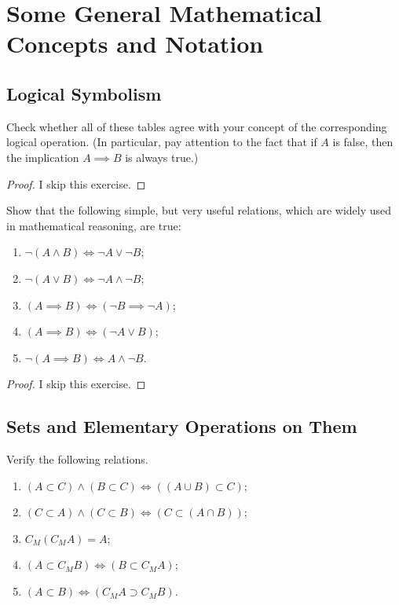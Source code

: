 \chapter{Some General Mathematical Concepts and Notation}

\section{Logical Symbolism}

\begin{exercise}
    Check whether all of these tables agree with your concept of the corresponding logical operation. (In particular, pay attention to the fact that if $A$ is false, then the implication $A\implies B$ is always true.)
\end{exercise}

\begin{proof}
    I skip this exercise.
\end{proof}

\begin{exercise}
    Show that the following simple, but very useful relations, which are widely used in mathematical reasoning, are true:
    \begin{enumerate}[label={(\alph*)}]
        \item $\neg(A\land B) \Leftrightarrow \neg A\lor \neg B$;
        \item $\neg(A\lor B) \Leftrightarrow \neg A\land \neg B$;
        \item $(A\implies B) \Leftrightarrow (\neg B\implies \neg A)$;
        \item $(A\implies B) \Leftrightarrow (\neg A\lor B)$;
        \item $\neg(A\implies B) \Leftrightarrow A\land \neg B$.
    \end{enumerate}
\end{exercise}

\begin{proof}
    I skip this exercise.
\end{proof}

\section{Sets and Elementary Operations on Them}

\begin{exercise}
    Verify the following relations.
    \begin{enumerate}[label={(\alph*)}]
        \item $(A\subset C)\land (B\subset C) \Leftrightarrow ((A\cup B)\subset C)$;
        \item $(C\subset A)\land (C\subset B) \Leftrightarrow (C\subset (A\cap B))$;
        \item $C_{M}(C_{M}A) = A$;
        \item $(A\subset C_{M}B) \Leftrightarrow (B\subset C_{M}A)$;
        \item $(A\subset B)\Leftrightarrow (C_{M}A \supset C_{M}B)$.
    \end{enumerate}
\end{exercise}

